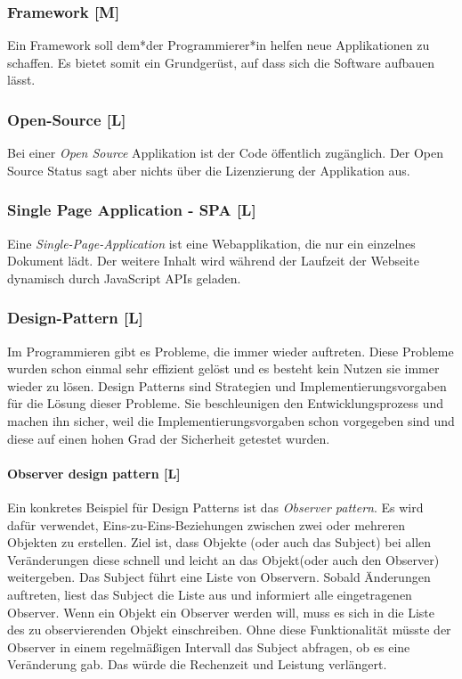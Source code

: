 \subsubsection{Framework [M]}

Ein Framework soll dem*der Programmierer*in helfen neue Applikationen zu schaffen. Es bietet somit ein Grundgerüst, auf dass sich die Software aufbauen lässt.  

\subsubsection{Open-Source [L]}
Bei einer \emph{Open Source} Applikation ist der Code öffentlich zugänglich. Der Open Source Status sagt aber nichts über die Lizenzierung der Applikation aus. \cite{WhatOpenSource}

\subsubsection{Single Page Application - SPA [L]}
\label{glos:spa}
Eine \emph{Single-Page-Application} ist eine Webapplikation, die nur ein einzelnes Dokument lädt. Der weitere Inhalt wird während der Laufzeit der Webseite dynamisch durch JavaScript APIs geladen. \cite{WhatSPA}


\subsubsection{Design-Pattern [L]}
\label{glos:pattern}
Im Programmieren gibt es Probleme, die immer wieder auftreten. Diese Probleme wurden schon einmal sehr effizient gelöst und es besteht kein Nutzen sie immer wieder zu lösen. Design Patterns sind Strategien und Implementierungsvorgaben für die Lösung dieser Probleme. Sie beschleunigen den Entwicklungsprozess und machen ihn sicher, weil die Implementierungsvorgaben schon vorgegeben sind und diese auf einen hohen Grad der Sicherheit getestet wurden. \cite{DesignPatterns}

\paragraph{Observer design pattern [L]}
\label{txt:glos:observerDesignPattern}
Ein konkretes Beispiel für Design Patterns ist das \emph{Observer pattern}. Es wird dafür verwendet, Eins-zu-Eins-Beziehungen zwischen zwei oder mehreren Objekten zu erstellen. Ziel ist, dass Objekte (oder auch das Subject) bei allen Veränderungen diese schnell und leicht an das Objekt(oder auch den Observer) weitergeben.  Das Subject führt eine Liste von Observern. Sobald Änderungen auftreten, liest das Subject die Liste aus und informiert alle eingetragenen Observer. Wenn ein Objekt ein Observer werden will, muss es sich in die Liste des zu observierenden Objekt einschreiben. Ohne diese Funktionalität müsste der Observer in einem regelmäßigen Intervall das Subject abfragen, ob es eine Veränderung gab. Das würde die Rechenzeit und Leistung verlängert. \cite{ObserverPatternExplaination}

